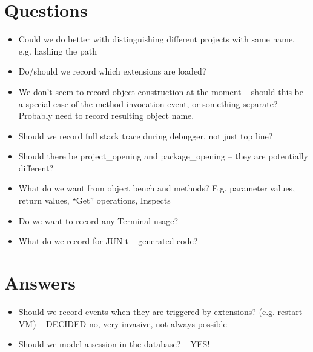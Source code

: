 \documentclass{book}
\begin{document}
\section{Questions}

\begin{itemize}
\item Could we do better with distinguishing different projects with same
  name, e.g. hashing the path
\item Do/should we record which extensions are loaded?
\item We don't seem to record object construction at the moment -- should this be a
  special case of the method invocation event, or something separate?
  Probably need to record resulting object name.
\item Should we record full stack trace during debugger, not just top line?
\item Should there be project_opening and package_opening -- they are potentially
different?
\item What do we want from object bench and methods?  E.g. parameter values,
  return values, ``Get'' operations, Inspects
\item Do we want to record any Terminal usage?
\item What do we record for JUNit -- generated code?
\end{itemize}

\section{Answers}

\begin{itemize}
\item Should we record events when they are triggered by extensions?
  (e.g. restart VM) -- DECIDED no, very invasive, not always possible
\item Should we model a session in the database? -- YES!
\end{itemize}
\end{document}
